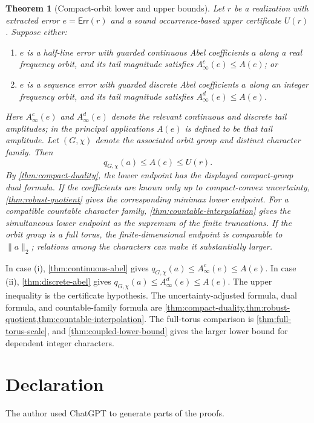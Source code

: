 \documentclass[12pt,a4paper,twoside]{extarticle}
\makeatletter
\theoremstyle{compactplain}
\newtheorem{theorem}{Theorem}[section]
\theoremstyle{compactdef}
\renewenvironment{proof}[1][\proofname]{\par\pushQED{\qed}\normalfont
  \topsep2pt\trivlist\item[\hskip\labelsep\bfseries #1\@addpunct{.}]\ignorespaces}
 {\popQED\endtrivlist\@endpefalse}
\newcommand{\Err}{\mathsf{Err}}
\makeatother
\begin{document}
\begin{theorem}[Compact-orbit lower and upper bounds]\label{thm:summary}
Let $r$ be a realization with extracted error $e=\Err(r)$ and a sound occurrence-based upper certificate $U(r)$.  Suppose either:
\begin{enumerate}[label=(\roman*)]
\item $e$ is a half-line error with guarded continuous Abel coefficients $a$ along a real frequency orbit, and its tail magnitude satisfies $A_\infty^c(e)\le A(e)$; or
\item $e$ is a sequence error with guarded discrete Abel coefficients $a$ along an integer frequency orbit, and its tail magnitude satisfies $A_\infty^d(e)\le A(e)$.
\end{enumerate}
Here $A_\infty^c(e)$ and $A_\infty^d(e)$ denote the relevant continuous and discrete tail amplitudes; in the principal applications $A(e)$ is defined to be that tail amplitude.  Let $(G,\chi)$ denote the associated orbit group and distinct character family.  Then
\[
 q_{G,\chi}(a)\le A(e)\le U(r).
\]
By \cref{thm:compact-duality}, the lower endpoint has the displayed compact-group dual formula.  If the coefficients are known only up to compact-convex uncertainty, \cref{thm:robust-quotient} gives the corresponding minimax lower endpoint.  For a compatible countable character family, \cref{thm:countable-interpolation} gives the simultaneous lower endpoint as the supremum of the finite truncations.  If the orbit group is a full torus, the finite-dimensional endpoint is comparable to $\|a\|_2$; relations among the characters can make it substantially larger.
\end{theorem}
\begin{proof}
In case (i), \cref{thm:continuous-abel} gives $q_{G,\chi}(a)\le A_\infty^c(e)\le A(e)$.  In case (ii), \cref{thm:discrete-abel} gives $q_{G,\chi}(a)\le A_\infty^d(e)\le A(e)$.  The upper inequality is the certificate hypothesis.  The uncertainty-adjusted formula, dual formula, and countable-family formula are \cref{thm:compact-duality,thm:robust-quotient,thm:countable-interpolation}.  The full-torus comparison is \cref{thm:full-torus-scale}, and \cref{thm:coupled-lower-bound} gives the larger lower bound for dependent integer characters.
\end{proof}


\newpage

\section*{Declaration}
The author used ChatGPT to generate parts of the proofs.
\end{document}

